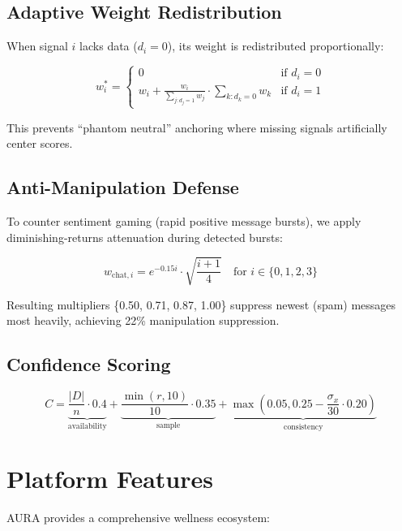 \documentclass[conference]{IEEEtran}
\begin{document}
\subsection{Adaptive Weight Redistribution}

When signal $i$ lacks data ($d_i = 0$), its weight is redistributed proportionally:

\begin{equation}
w_i^{*} =
\begin{cases}
0 & \text{if } d_i = 0 \\
w_i + \frac{w_i}{\sum_{j: d_j=1} w_j} \cdot \sum_{k: d_k=0} w_k & \text{if } d_i = 1
\end{cases}
\end{equation}

This prevents ``phantom neutral'' anchoring where missing signals artificially center scores.

\subsection{Anti-Manipulation Defense}

To counter sentiment gaming (rapid positive message bursts), we apply diminishing-returns attenuation during detected bursts:

\begin{equation}
w_{\text{chat},i} = e^{-0.15i} \cdot \sqrt{\frac{i + 1}{4}} \quad \text{for } i \in \{0,1,2,3\}
\end{equation}

Resulting multipliers \{0.50, 0.71, 0.87, 1.00\} suppress newest (spam) messages most heavily, achieving 22\% manipulation suppression.

\subsection{Confidence Scoring}

\begin{equation}
C = \underbrace{\frac{|D|}{n} \cdot 0.4}_{\text{availability}} + \underbrace{\frac{\min(r, 10)}{10} \cdot 0.35}_{\text{sample}} + \underbrace{\max\left(0.05, 0.25 - \frac{\sigma_x}{30} \cdot 0.20\right)}_{\text{consistency}}
\end{equation}

\section{Platform Features}

AURA provides a comprehensive wellness ecosystem:
\end{document}
